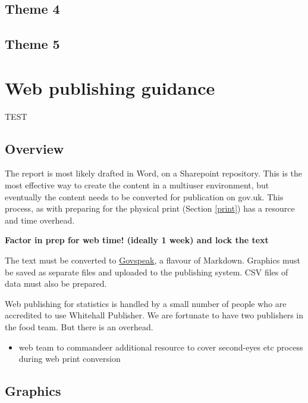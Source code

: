 \documentclass[
]{book}
\providecommand{\tightlist}{%
  \setlength{\itemsep}{0pt}\setlength{\parskip}{0pt}}
\begin{document}
\hypertarget{theme-4}{%
\section{Theme 4}\label{theme-4}}

\hypertarget{theme-5}{%
\section{Theme 5}\label{theme-5}}

\hypertarget{web}{%
\chapter{Web publishing guidance}\label{web}}

TEST

\hypertarget{overview}{%
\section{Overview}\label{overview}}

The report is most likely drafted in Word, on a Sharepoint repository. This is
the most effective way to create the content in a multiuser environment, but
eventually the content needs to be converted for publication on gov.uk. This
process, as with preparing for the physical print (Section \ref{print}) has a
resource and time overhead.

\textbf{Factor in prep for web time! (ideally 1 week) and lock the text}

The text must be converted to
\href{https://govspeak-preview.publishing.service.gov.uk/guide}{Govspeak}, a flavour
of Markdown. Graphics must be saved as separate files and uploaded to the
publishing system. CSV files of data must also be prepared.

Web publishing for statistics is handled by a small number of people who are
accredited to use Whitehall Publisher. We are fortunate to have two publishers
in the food team. But there is an overhead.

\begin{itemize}
\tightlist
\item
  web team to commandeer additional resource to cover second-eyes etc process during web print conversion
\end{itemize}

\hypertarget{graphics}{%
\section{Graphics}\label{graphics}}
\end{document}
